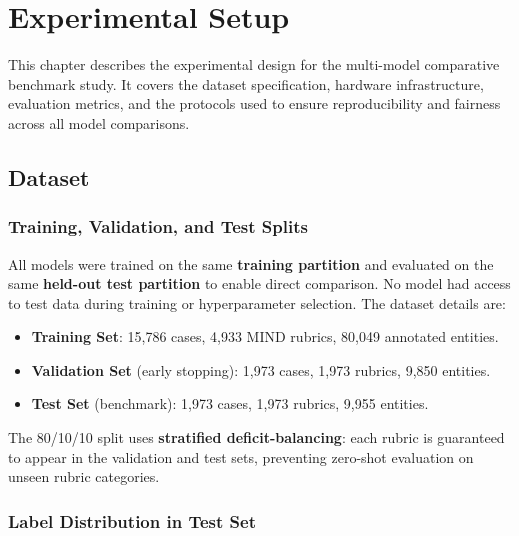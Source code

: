 
\chapter{Experimental Setup}
\label{Chapter5}

This chapter describes the experimental design for the multi-model comparative benchmark study. It covers the dataset specification, hardware infrastructure, evaluation metrics, and the protocols used to ensure reproducibility and fairness across all model comparisons.


\section{Dataset}

\subsection{Training, Validation, and Test Splits}

All models were trained on the same \textbf{training partition} and evaluated on the same \textbf{held-out test partition} to enable direct comparison. No model had access to test data during training or hyperparameter selection. The dataset details are:

\begin{itemize}
  \item \textbf{Training Set}: 15,786 cases, 4,933 MIND rubrics, 80,049 annotated entities.
  \item \textbf{Validation Set} (early stopping): 1,973 cases, 1,973 rubrics, 9,850 entities.
  \item \textbf{Test Set} (benchmark): 1,973 cases, 1,973 rubrics, 9,955 entities.
\end{itemize}

The 80/10/10 split uses \textbf{stratified deficit-balancing}: each rubric is guaranteed to appear in the validation and test sets, preventing zero-shot evaluation on unseen rubric categories.

\subsection{Label Distribution in Test Set}

